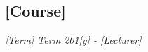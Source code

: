 \label{[label]}
\begin{chapterbox}
\vspace{-60pt}
\chapter{[Course]}
\vspace{-30pt}
\centering\normalsize\textit{[Term] Term 201[y] - [Lecturer]}
\end{chapterbox}
\vspace{20pt}
\minitoc
\newpage
\section{}









